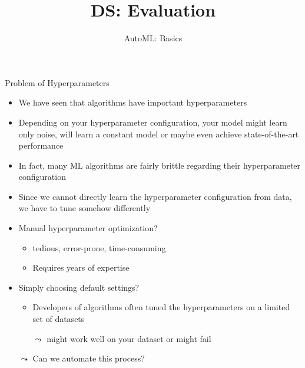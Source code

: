 \documentclass[aspectratio=169]{../latex_main/tntbeamer}  %
\title[Evaluation]{DS: Evaluation}
\subtitle{AutoML: Basics}
\begin{document}
\maketitle

\begin{frame}[c]{Problem of Hyperparameters}
	
	\begin{itemize}
	    \item We have seen that algorithms have important hyperparameters
	    \item Depending on your hyperparameter configuration, your model might learn only noise, will learn a constant model or maybe even achieve state-of-the-art performance 
	    \item In fact, many ML algorithms are fairly brittle regarding their hyperparameter configuration
	    \medskip
	    \item Since we cannot directly learn the hyperparameter configuration from data, we have to tune somehow differently
	    \item Manual hyperparameter optimization?
	    \begin{itemize}
	        \item tedious, error-prone, time-consuming
	        \item Requires years of expertise
	    \end{itemize}
	    \smallskip
	    \item Simply choosing default settings?
	    \begin{itemize}
	        \item Developers of algorithms often tuned the hyperparameters on a limited set of datasets
	        \item[$\leadsto$] might work well on your dataset or might fail
	    \end{itemize}
	    \item[$\leadsto$] Can we automate this process?
	\end{itemize}
	
\end{frame}
\end{document}
